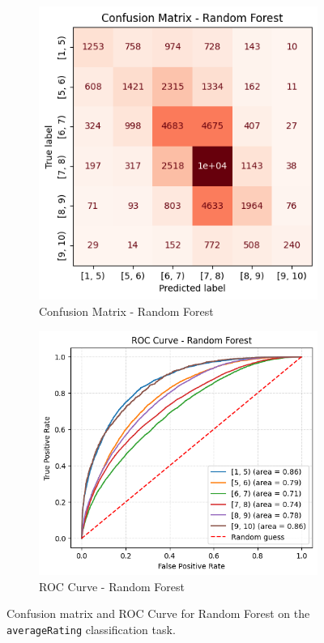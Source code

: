 \begin{figure}[H]
    \centering
    \begin{subfigure}[b]{0.44\textwidth}
        \centering
        \includegraphics[width=\textwidth]{plotsss/conf_matr_rf_rating.png}
        \caption{Confusion Matrix - Random Forest}
        \label{fig:cm_rf}
    \end{subfigure}
    \hfill
    \begin{subfigure}[b]{0.52\textwidth}
        \centering
        \includegraphics[width=\textwidth]{plotsss/roc_rf_rating.png}
        \caption{ROC Curve - Random Forest}
        \label{fig:roc_rating}
    \end{subfigure}
    \caption{Confusion matrix and ROC Curve for Random Forest on the \texttt{averageRating} classification task.}
    \label{fig:cm_roc_rating}
\end{figure}
